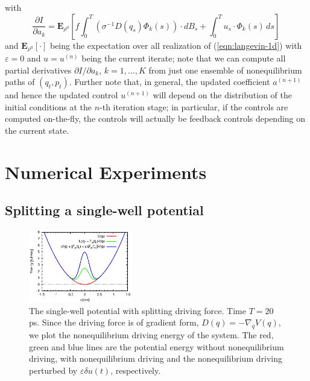 \documentclass[]{tMPH2e}
\newcommand{\eps}{\varepsilon}
\newcommand{\bE}{{\mathbf E}}
\begin{document}
with
\begin{equation}\label{dida}
\frac{\partial I}{\partial a_{k}} = \bE_{\rho^0}\left[f\int_{0}^{T}(\sigma^{-1}D(q_{s})\Phi_{k}(s))\cdot dB_{s} + \int_{0}^{T}u_{s}\cdot\Phi_{k}(s)\,ds \right] \,
\end{equation}
and $\bE_{\rho^0}[\cdot]$ being the expectation over all realization of (\ref{eqn:langevin-1d}) with $\eps=0$ and $u=u^{(n)}$ being the current iterate; note that we can compute all partial derivatives $\partial I/\partial a_k$, $k=1,\ldots,K$ from just one ensemble of nonequilibrium paths of $(q_{t},p_{t})$. Further note that, in general, the updated coefficient $a^{(n+1)}$ and hence the updated control $u^{(n+1)}$ will depend on the distribution of the initial conditions at the $n$-th iteration stage; in particular, if the controls are computed on-the-fly, the controls will actually be feedback controls depending on the current state.    





\section{Numerical Experiments}

\subsection{Splitting a single-well potential}

\begin{figure}
  \centering
  \includegraphics[width=0.4\textwidth]{figs/fig-split-pot.eps}
  \caption{The single-well potential with  splitting driving
    force. Time $T = 20$ ps.  Since the driving force is
    of gradient form, $ D( q) = -\nabla_{q}V( q)$,
    we plot the nonequilibrium driving energy of the system.  The red,
    green and blue lines are the potential energy without
    nonequilibrium driving, with nonequilibrium driving and
    the nonequilibrium driving perturbed by $\eps\delta u(t)$,
    respectively.  }
  \label{fig:tmp4}
\end{figure}
\end{document}
